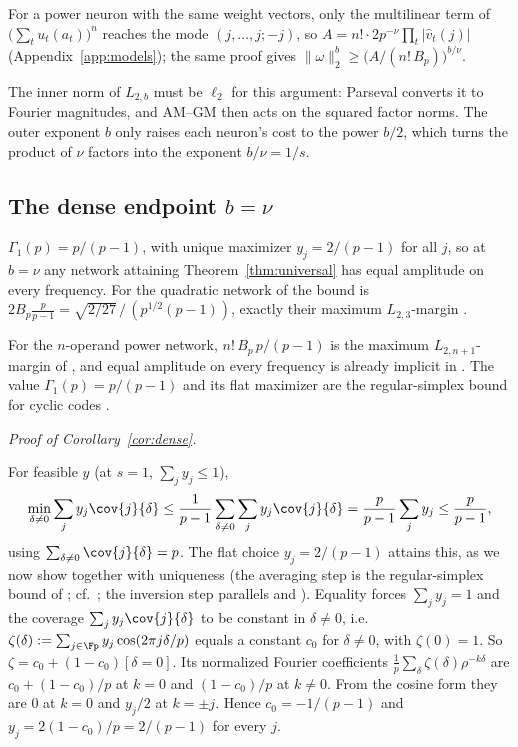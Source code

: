 For a power neuron with the same weight vectors, only the multilinear term of $\big(\sum_tu_t(a_t)\big)^n$ reaches the mode $(j,\dots,j;-j)$, so $A=n!\cdot2p^{-\nu}\prod_t|\hat v_t(j)|$ (Appendix~\ref{app:models}); the same proof gives $\|\omega\|_2^b\ge\big(A/(n!\,B_p)\big)^{b/\nu}$.

The inner norm of $L_{2,b}$ must be $\ell_2$ for this argument: Parseval converts it to Fourier magnitudes, and AM--GM then acts on the squared factor norms. The outer exponent $b$ only raises each neuron's cost to the power $b/2$, which turns the product of $\nu$ factors into the exponent $b/\nu=1/s$.

\subsection{The dense endpoint \texorpdfstring{$b=\nu$}{b = nu}}\label{app:dense}

\begin{corollary}[$b=\nu$: every frequency is used]\label{cor:dense}
$\Gamma_1(p)=p/(p-1)$, with unique maximizer $y_j=2/(p-1)$ for all $j$, so at $b=\nu$ any network attaining Theorem~\ref{thm:universal} has equal amplitude on every frequency. For the quadratic network of \citet{morwani2024feature} the bound is $2B_p\frac p{p-1}=\sqrt{2/27}\,/\,(p^{1/2}(p-1))$, exactly their maximum $L_{2,3}$-margin \citep[Thm.~7; width $m\ge4(p-1)$]{morwani2024feature}.
\end{corollary}
For the $n$-operand power network, $n!\,B_p\,p/(p-1)$ is the maximum $L_{2,n+1}$-margin of \citet[Thm.~4.1]{li2025nsum}, and equal amplitude on every frequency is already implicit in \citet[App.~F.3]{morwani2024feature}. The value $\Gamma_1(p)=p/(p-1)$ and its flat maximizer are the regular-simplex bound for cyclic codes \citep{rankin1955closest,slepian1968group}.

\emph{Proof of Corollary~\ref{cor:dense}.}

For feasible $y$ (at $s=1$, $\sum_jy_j\le1$),
\[
\min_{\delta\neq0}\sum_jy_j\cov{j}{\delta}\le\frac1{p-1}\sum_{\delta\neq0}\sum_jy_j\cov{j}{\delta}=\frac p{p-1}\sum_jy_j\le\frac p{p-1},
\]
using $\sum_{\delta\neq0}\cov{j}{\delta}=p$. The flat choice $y_j=2/(p-1)$ attains this, as we now show together with uniqueness (the averaging step is the regular-simplex bound of \citealp{rankin1955closest}; cf.\ \citealp[\S3.5--3.6]{fiedler1973algebraic}; the inversion step parallels \citealp[App.~F.3]{morwani2024feature} and \citealp[Lemma~F.2]{li2025nsum}). Equality forces $\sum_jy_j=1$ and the coverage $\sum_jy_j\cov{j}{\delta}$ to be constant in $\delta\neq0$, i.e.\ $\zeta(\delta):=\sum_{j\in\Fp}y_j\cos(2\pi j\delta/p)$ equals a constant $c_0$ for $\delta\neq0$, with $\zeta(0)=1$. So $\zeta=c_0+(1-c_0)[\delta=0]$. Its normalized Fourier coefficients $\frac1p\sum_\delta\zeta(\delta)\rho^{-k\delta}$ are $c_0+(1-c_0)/p$ at $k=0$ and $(1-c_0)/p$ at $k\neq0$. From the cosine form they are $0$ at $k=0$ and $y_j/2$ at $k=\pm j$. Hence $c_0=-1/(p-1)$ and $y_j=2(1-c_0)/p=2/(p-1)$ for every $j$.

